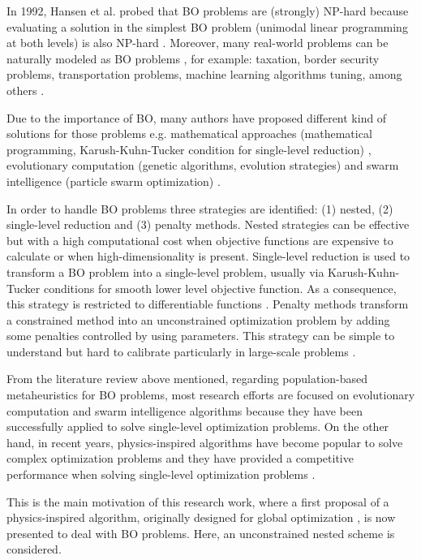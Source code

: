 \documentclass[conference]{IEEEtran}
\begin{document}
In 1992, Hansen et al. probed that BO problems are (strongly) NP-hard because 
evaluating a solution in the simplest BO problem (unimodal linear programming at
both levels) is also NP-hard \cite{hansen1992new,vicente1994descent}. Moreover,
many real-world problems can be naturally modeled as BO problems \cite{sinha2018review},
for example: taxation, border security problems, transportation problems, machine
learning algorithms tuning, among others \cite{bard2013practical,sinha2018review,arroyo2010bilevel}.

Due to the importance of BO, many authors have proposed different kind of solutions
for those problems e.g. mathematical approaches (mathematical programming,
Karush-Kuhn-Tucker condition for single-level reduction) \cite{dempe2002foundations,shi2005extended},
evolutionary computation (genetic algorithms, evolution strategies) and swarm
intelligence (particle swarm optimization) \cite{derrac2011practical,angelo2013differential,li2006hierarchical}.

In order to handle BO problems three strategies are identified: (1) nested,
(2) single-level reduction and (3) penalty methods. Nested strategies can be effective
but with a high computational cost when objective functions are expensive to
calculate or when high-dimensionality is present. Single-level reduction is used to
transform a BO problem into a single-level problem, usually via Karush-Kuhn-Tucker
conditions for smooth lower level objective function. As a consequence, this strategy
is restricted to differentiable functions \cite{dempe2002foundations,colson2007overview}.
Penalty methods transform a constrained method into an unconstrained optimization
problem by adding some penalties controlled by using parameters. This strategy
can be simple to understand but hard to calibrate particularly in large-scale
problems \cite{savard1994steepest,white1993penalty}.

From the literature review above mentioned, regarding population-based metaheuristics
for BO problems, most research efforts are focused on evolutionary computation and
swarm intelligence algorithms because they have been successfully applied to solve
single-level optimization problems.  On the other hand, in recent years, physics-inspired
algorithms have become popular to solve complex optimization problems and they
have provided a competitive performance when solving single-level optimization
problems \cite{fisicaSurvey}. 


This is the main motivation of this research work, where a first proposal of a
physics-inspired algorithm, originally designed for global optimization \cite{Mejia2018},
is now presented to deal with BO problems. Here, an unconstrained nested scheme
is considered.
\end{document}
